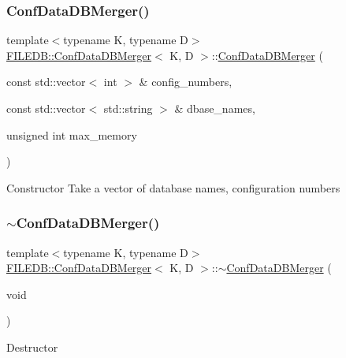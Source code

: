 \subsubsection{\texorpdfstring{ConfDataDBMerger()}{ConfDataDBMerger()}\hspace{0.1cm}{\footnotesize\ttfamily [2/4]}}
{\footnotesize\ttfamily template$<$typename K, typename D$>$ \\
\mbox{\hyperlink{classFILEDB_1_1ConfDataDBMerger}{F\+I\+L\+E\+D\+B\+::\+Conf\+Data\+D\+B\+Merger}}$<$ K, D $>$\+::\mbox{\hyperlink{classFILEDB_1_1ConfDataDBMerger}{Conf\+Data\+D\+B\+Merger}} (\begin{DoxyParamCaption}\item[{const std\+::vector$<$ int $>$ \&}]{config\+\_\+numbers,  }\item[{const std\+::vector$<$ std\+::string $>$ \&}]{dbase\+\_\+names,  }\item[{unsigned int}]{max\+\_\+memory }\end{DoxyParamCaption})\hspace{0.3cm}{\ttfamily [inline]}}

Constructor Take a vector of database names, configuration numbers \mbox{\label{classFILEDB_1_1ConfDataDBMerger_a1592d55d089ad7ead813ab8d2b955e09}} 
\subsubsection{\texorpdfstring{$\sim$ConfDataDBMerger()}{~ConfDataDBMerger()}\hspace{0.1cm}{\footnotesize\ttfamily [1/2]}}
{\footnotesize\ttfamily template$<$typename K, typename D$>$ \\
\mbox{\hyperlink{classFILEDB_1_1ConfDataDBMerger}{F\+I\+L\+E\+D\+B\+::\+Conf\+Data\+D\+B\+Merger}}$<$ K, D $>$\+::$\sim$\mbox{\hyperlink{classFILEDB_1_1ConfDataDBMerger}{Conf\+Data\+D\+B\+Merger}} (\begin{DoxyParamCaption}\item[{void}]{ }\end{DoxyParamCaption})\hspace{0.3cm}{\ttfamily [inline]}}

Destructor \mbox{\label{classFILEDB_1_1ConfDataDBMerger_a2d22aeb10cb29cd9acb42cbd042c74d3}} 
